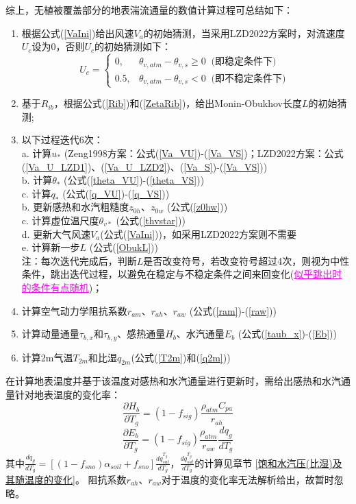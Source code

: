 综上，无植被覆盖部分的地表湍流通量的数值计算过程可总结如下：
\begin{enumerate}
     \item 根据公式(\ref{VaIni})给出风速$V_{a}$的初始猜测，当采用LZD2022方案时，对流速度$U_c$设为0，否则$U_c$的初始猜测如下：
       \begin{equation}
          U_{c}= \begin{cases}
           0, & \theta_{v, atm}-\theta_{v, s} \geq 0\ \text { (即稳定条件下) } \\ 
           0.5, & \theta_{v, atm}-\theta_{v, s}<0\ \text { (即不稳定条件下) }
          \end{cases}
       \end{equation}
     \item 基于$R_{ib}$，根据公式(\ref{Rib})和(\ref{ZetaRib})，给出Monin-Obukhov长度$L$的初始猜测;
     \item 以下过程迭代6次：\\
     a. 计算$u_\ast$ (Zeng1998方案：公式(\ref{Va_VU})-(\ref{Va_VS})；LZD2022方案：公式(\ref{Va_U_LZD1})、(\ref{Va_U_LZD2})、(\ref{Va_S})-(\ref{Va_VS})) \\
     b. 计算$\theta_\ast$ (公式(\ref{theta_VU})-(\ref{theta_VS})) \\
     c. 计算$q_\ast$ (公式(\ref{q_VU})-(\ref{q_VS})) \\
     b. 更新感热和水汽粗糙度$z_{0h}$、$z_{0w}$ (公式(\ref{z0hw})) \\
     c. 计算虚位温尺度$\theta_{v\ast}$ (公式(\ref{thvstar})) \\
     d. 更新大气风速$V_a$(公式(\ref{VaIni}))，如采用LZD2022方案则不需要\\
     e. 计算新一步$L$ (公式(\ref{ObukL})) \\
     注：每次迭代完成后，判断$L$是否改变符号，若改变符号超过4次，则视为中性条件，跳出迭代过程，以避免在稳定与不稳定条件之间来回变化(\textcolor{magenta}{\underline{似乎跳出时的条件有点随机}})；
     \item 计算空气动力学阻抗系数$r_{am}$、$r_{ah}$、$r_{aw}$ (公式(\ref{ram})-(\ref{raw}))
     \item 计算动量通量$\tau_{b,x}$和$\tau_{b,y}$、感热通量$H_b$、水汽通量$E_b$ (公式(\ref{taub_x})-(\ref{Eb}))
     \item 计算2m气温$T_{2m}$和比湿$q_{2m}$(公式(\ref{T2m})和(\ref{q2m}))
 \end{enumerate}

 在计算地表温度并基于该温度对感热和水汽通量进行更新时，需给出感热和水汽通量针对地表温度的变化率：
\begin{equation}
     \frac{\partial H_{b}}{\partial T_{g}}=\left(1-f_{sig}\right) \frac{\rho_{atm} C_{p a}}{r_{a h}}
\end{equation}
\begin{equation}
     \frac{\partial E_{b}}{\partial T_{g}}=\left(1-f_{sig}\right) \frac{\rho_{atm}}{r_{a w}} \frac{d q_{g}}{d T_{g}}
\end{equation}
其中$\frac{dq_g}{dT_g}=\left[\left(1-f_{sno}\right)\alpha_{soil}+f_{sno}\right]\frac{dq_{sat}^{T_g}}{dT_g}$，$\frac{dq_{sat}^{T_g}}{dT_g}$的计算见章节 \ref{饱和水汽压(比湿)及其随温度的变化}。
阻抗系数$r_{ah}$、$r_{aw}$对于温度的变化率无法解析给出，故暂时忽略。


